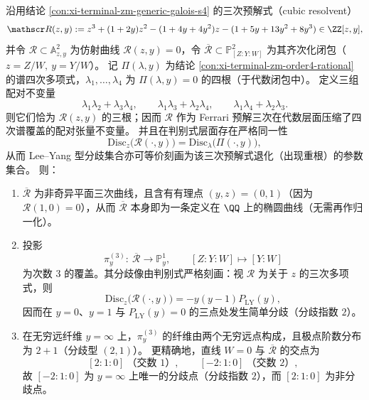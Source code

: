 \begin{conclusion}\label{con:xi-terminal-zm-resolvent-cubic-plane-cubic-geometry}
沿用结论 \ref{con:xi-terminal-zm-generic-galois-s4} 的三次预解式（cubic resolvent）
\[
\mathscr R(z,y)
:=z^3+(1+2y)z^2-(1+4y+4y^2)z-(1+5y+13y^2+8y^3)\in\ZZ[z,y],
\]
并令 \(\mathcal R\subset \mathbb A^2_{z,y}\) 为仿射曲线 \(\mathscr R(z,y)=0\)，令 \(\overline{\mathcal R}\subset \mathbb P^2_{[Z:Y:W]}\) 为其齐次化闭包（\(z=Z/W,\ y=Y/W\)）。
记 \(\Pi(\lambda,y)\) 为结论 \ref{con:xi-terminal-zm-order4-rational} 的谱四次多项式，\(\lambda_1,\dots,\lambda_4\) 为 \(\Pi(\lambda,y)=0\) 的四根（于代数闭包中）。
定义三组配对不变量
\[
\lambda_1\lambda_2+\lambda_3\lambda_4,\qquad
\lambda_1\lambda_3+\lambda_2\lambda_4,\qquad
\lambda_1\lambda_4+\lambda_2\lambda_3.
\]
则它们恰为 \(\mathscr R(z,y)\) 的三根；因而 \(\mathscr R\) 作为 Ferrari 预解三次在代数层面压缩了四次谱覆盖的配对张量不变量。
并且在判别式层面存在严格同一性
\[
\mathrm{Disc}_{z}\bigl(\mathscr R(\cdot,y)\bigr)=\mathrm{Disc}_{\lambda}\bigl(\Pi(\cdot,y)\bigr),
\]
从而 Lee--Yang 型分歧集合亦可等价刻画为该三次预解式退化（出现重根）的参数集合。
则：
\begin{enumerate}
  \item \(\overline{\mathcal R}\) 为非奇异平面三次曲线，且含有有理点 \((y,z)=(0,1)\)（因为 \(\mathscr R(1,0)=0\)），从而 \(\overline{\mathcal R}\) 本身即为一条定义在 \(\QQ\) 上的椭圆曲线（无需再作归一化）。
  \item 投影
  \[
  \pi^{(3)}_y:\ \overline{\mathcal R}\longrightarrow \mathbb P^1_y,\qquad [Z:Y:W]\longmapsto [Y:W]
  \]
  为次数 \(3\) 的覆盖。其分歧像由判别式严格刻画：视 \(\mathscr R\) 为关于 \(z\) 的三次多项式，则
  \[
  \mathrm{Disc}_{z}\bigl(\mathscr R(\cdot,y)\bigr)=-y(y-1)P_{\mathrm{LY}}(y),
  \]
  因而在 \(y=0\)、\(y=1\) 与 \(P_{\mathrm{LY}}(y)=0\) 的三点处发生简单分歧（分歧指数 \(2\)）。
  \item 在无穷远纤维 \(y=\infty\) 上，\(\pi^{(3)}_y\) 的纤维由两个无穷远点构成，且极点阶数分布为 \(2+1\)（分歧型 \((2,1)\)）。
  更精确地，直线 \(W=0\) 与 \(\overline{\mathcal R}\) 的交点为
  \[
  [2:1:0]\ \text{（交数 \(1\)）},\qquad [-2:1:0]\ \text{（交数 \(2\)）},
  \]
  故 \([-2:1:0]\) 为 \(y=\infty\) 上唯一的分歧点（分歧指数 \(2\)），而 \([2:1:0]\) 为非分歧点。
\end{enumerate}
\end{conclusion}
